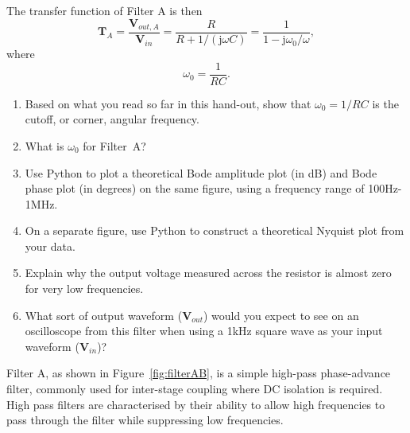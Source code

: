 \documentclass{article}
\begin{document}
The transfer function of Filter A is then
\begin{equation}
  \mathbf{T}_A=\frac{\mathbf{V}_{out, A}}{\mathbf{V}_{in}}=
  \frac{R}{R+1/(\mathrm{j}\omega C)}=\frac{1}{1-\mathrm{j}\omega_0/\omega},
\end{equation}
where
\begin{equation}
  \omega_0=\frac{1}{RC}.
\end{equation}
\begin{enumerate}
\item Based on what you read so far in this hand-out, show that
  $\omega_0 = 1/RC$ is the cutoff, or corner, angular
  frequency. %
  
\item What is $\omega_0$ for Filter~A?
  
\item Use Python to plot a theoretical Bode amplitude plot (in
  dB) and Bode phase plot (in degrees) on the same figure, using a
  frequency range of 100Hz-1MHz.
  
\item On a separate figure, use Python to
  construct a theoretical Nyquist plot from your data.
  
\item Explain why the output voltage measured
  across the resistor is almost zero for very low
  frequencies. %
\item What sort of output waveform ($\mathbf{V}_{out}$) would you
  expect to see on an oscilloscope from this filter when using a 1kHz
  square wave as your input waveform
  ($\mathbf{V}_{in}$)? %
\end{enumerate}

Filter A, as shown in Figure~\ref{fig:filterAB}, is a simple high-pass
phase-advance filter, commonly used for inter-stage coupling where DC
isolation is required.  High pass filters are characterised by their
ability to allow high frequencies to pass through the filter while
suppressing low frequencies.
\end{document}
